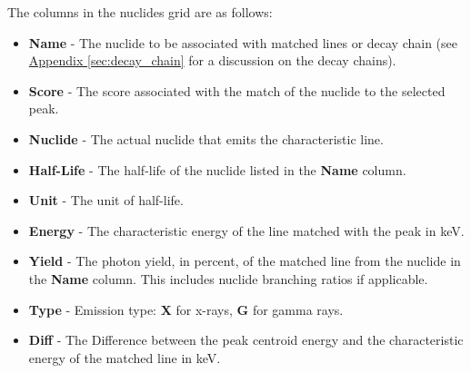 \documentclass[12pt,report,justified]{SANDreport}
\begin{document}
The columns in the nuclides grid are as follows:
\begin{itemize}
    \item \textbf{Name} - The nuclide to be associated with matched lines or decay chain (see \hyperref[sec:decay_chain]{Appendix \ref{sec:decay_chain}} for a discussion on the decay chains).
    \item \textbf{Score} - The score associated with the match of the nuclide to the selected peak.
    \item \textbf{Nuclide} - The actual nuclide that emits the characteristic line.
    \item \textbf{Half-Life} - The half-life of the nuclide listed in the \textbf{Name} column.
    \item \textbf{Unit} - The unit of half-life.
    \item \textbf{Energy} - The characteristic energy of the line matched with the peak in keV.
    \item \textbf{Yield} - The photon yield, in percent, of the matched line from the nuclide in the \textbf{Name} column. This includes nuclide branching ratios if applicable.
    \item \textbf{Type} - Emission type: \textbf{X} for x-rays, \textbf{G} for gamma rays.
    \item \textbf{Diff} - The Difference between the peak centroid energy and the characteristic energy of the matched line in keV.
\end{itemize}
\end{document}
